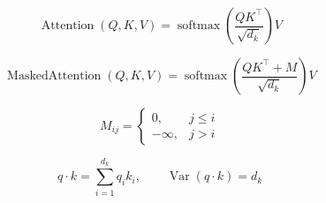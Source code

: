 \[
\operatorname{Attention}(Q,K,V)
=
\operatorname{softmax}\left(
\frac{QK^\top}{\sqrt{d_k}}
\right)V
\]

\[
\operatorname{MaskedAttention}(Q,K,V)
=
\operatorname{softmax}\left(
\frac{QK^\top + M}{\sqrt{d_k}}
\right)V
\]

\[
M_{ij}=
\begin{cases}
0, & j \le i \\
-\infty, & j > i
\end{cases}
\]

\[
q \cdot k = \sum_{i=1}^{d_k}q_i k_i,
\qquad
\operatorname{Var}(q \cdot k)=d_k
\]
